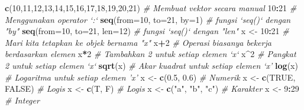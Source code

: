 \documentclass[
]{book}
\newenvironment{Shaded}{\begin{snugshade}}{\end{snugshade}}
\newcommand{\CommentTok}[1]{\textcolor[rgb]{0.56,0.35,0.01}{\textit{#1}}}
\newcommand{\DataTypeTok}[1]{\textcolor[rgb]{0.13,0.29,0.53}{#1}}
\newcommand{\DecValTok}[1]{\textcolor[rgb]{0.00,0.00,0.81}{#1}}
\newcommand{\FloatTok}[1]{\textcolor[rgb]{0.00,0.00,0.81}{#1}}
\newcommand{\KeywordTok}[1]{\textcolor[rgb]{0.13,0.29,0.53}{\textbf{#1}}}
\newcommand{\NormalTok}[1]{#1}
\newcommand{\OperatorTok}[1]{\textcolor[rgb]{0.81,0.36,0.00}{\textbf{#1}}}
\newcommand{\OtherTok}[1]{\textcolor[rgb]{0.56,0.35,0.01}{#1}}
\newcommand{\StringTok}[1]{\textcolor[rgb]{0.31,0.60,0.02}{#1}}
\begin{document}
\begin{Shaded}
\begin{Highlighting}[]
\KeywordTok{c}\NormalTok{(}\DecValTok{10}\NormalTok{,}\DecValTok{11}\NormalTok{,}\DecValTok{12}\NormalTok{,}\DecValTok{13}\NormalTok{,}\DecValTok{14}\NormalTok{,}\DecValTok{15}\NormalTok{,}\DecValTok{16}\NormalTok{,}\DecValTok{17}\NormalTok{,}\DecValTok{18}\NormalTok{,}\DecValTok{19}\NormalTok{,}\DecValTok{20}\NormalTok{,}\DecValTok{21}\NormalTok{) 		  }\CommentTok{# Membuat vektor secara manual}
\DecValTok{10}\OperatorTok{:}\DecValTok{21}                                  			\CommentTok{# Menggunakan operator `:`}
\KeywordTok{seq}\NormalTok{(}\DataTypeTok{from=}\DecValTok{10}\NormalTok{, }\DataTypeTok{to=}\DecValTok{21}\NormalTok{, }\DataTypeTok{by=}\DecValTok{1}\NormalTok{)              		  }\CommentTok{# fungsi `seq()` dengan "by"}
\KeywordTok{seq}\NormalTok{(}\DataTypeTok{from=}\DecValTok{10}\NormalTok{, }\DataTypeTok{to=}\DecValTok{21}\NormalTok{, }\DataTypeTok{len=}\DecValTok{12}\NormalTok{)          		    }\CommentTok{# fungsi `seq()` dengan "len"}
\NormalTok{x <-}\StringTok{ }\DecValTok{10}\OperatorTok{:}\DecValTok{21}                             			\CommentTok{# Mari kita tetapkan ke objek bernama "x"}
\NormalTok{x}\OperatorTok{+}\DecValTok{2}                                    			\CommentTok{# Operasi biasanya bekerja berdasarkan elemen}
\NormalTok{x}\OperatorTok{*}\DecValTok{2}                                    			\CommentTok{# Tambahkan 2 untuk setiap elemen `x`}
\NormalTok{x}\OperatorTok{^}\DecValTok{2}                                    			\CommentTok{# Pangkat 2 untuk setiap elemen `x` }
\KeywordTok{sqrt}\NormalTok{(x)                                			}\CommentTok{# Akar kuadrat untuk setiap elemen ‘x’}
\KeywordTok{log}\NormalTok{(x)                                			}\CommentTok{# Logaritma untuk setiap elemen 'x’ }
\NormalTok{x <-}\StringTok{ }\KeywordTok{c}\NormalTok{(}\FloatTok{0.5}\NormalTok{, }\FloatTok{0.6}\NormalTok{)                       			}\CommentTok{# Numerik}
\NormalTok{x <-}\StringTok{ }\KeywordTok{c}\NormalTok{(}\OtherTok{TRUE}\NormalTok{, }\OtherTok{FALSE}\NormalTok{)                    			}\CommentTok{# Logis}
\NormalTok{x <-}\StringTok{ }\KeywordTok{c}\NormalTok{(T, F)                        				}\CommentTok{# Logis}
\NormalTok{x <-}\StringTok{ }\KeywordTok{c}\NormalTok{(}\StringTok{"a"}\NormalTok{, }\StringTok{"b"}\NormalTok{, }\StringTok{"c"}\NormalTok{)                  			}\CommentTok{# Karakter}
\NormalTok{x <-}\StringTok{ }\DecValTok{9}\OperatorTok{:}\DecValTok{29}                              			\CommentTok{# Integer}

\end{Highlighting}
\end{Shaded}
\end{document}
